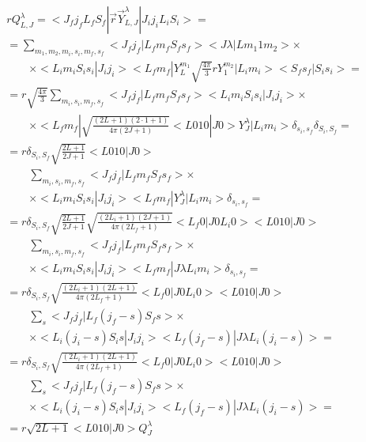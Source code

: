 \begin{align}
    \begin{split}
        &r Q_{L, J}^\lambda = <J_f j_f L_f S_f|\vec{r} \vec{Y}^{\lambda}_{L, J}|J_i j_i L_i S_i> = \\
        &= \sum_{m_1, m_2, m_i, s_i, m_f, s_f} <J_f j_f| L_f m_f S_f s_f> <J \lambda| L m_1 1 m_2> \times \\
        &\qquad\times <L_i m_i S_i s_i | J_i j_i> <L_f m_f| Y_L^{m_1} \sqrt{\frac{4 \pi}{3}} r Y_{1}^{m_2}|L_i m_i> <S_f s_f|S_i s_i> = \\
        &= r \sqrt{\frac{4 \pi}{3}} \sum_{m_i, s_i, m_f, s_f} <J_f j_f| L_f m_f S_f s_f> <L_i m_i S_i s_i | J_i j_i> \times \\
        &\qquad\times <L_f m_f| \sqrt{\frac{(2L+1)(2\cdot1+1)}{4 \pi (2J + 1)}} <L 0 1 0 | J 0> Y_J^\lambda|L_i m_i> \delta_{s_i, s_f} \delta_{S_i, S_f} = \\
        &= r \delta_{S_i, S_f} \sqrt{\frac{2L+1}{2J+1}} <L 0 1 0 | J 0> \\
        &\qquad\sum_{m_i, s_i, m_f, s_f} <J_f j_f| L_f m_f S_f s_f> \times \\
        &\qquad\times <L_i m_i S_i s_i | J_i j_i> <L_f m_f| Y_J^\lambda |L_i m_i> \delta_{s_i, s_f} = \\
        &= r \delta_{S_i, S_f} \sqrt{\frac{2L+1}{2J+1}} \sqrt{\frac{(2L_i+1)(2J+1)}{4 \pi (2L_f+1)}} <L_f 0 | J 0 L_i 0> <L 0 1 0 | J 0> \\
        &\qquad \sum_{m_i, s_i, m_f, s_f} <J_f j_f| L_f m_f S_f s_f> \times \\
        &\qquad\times <L_i m_i S_i s_i | J_i j_i> <L_f m_f| J \lambda L_i m_i> \delta_{s_i, s_f} = \\
        &= r \delta_{S_i, S_f} \sqrt{\frac{(2L_i+1)(2L+1)}{4 \pi (2L_f+1)}} <L_f 0 | J 0 L_i 0> <L 0 1 0 | J 0> \\
        &\qquad \sum_{s} <J_f j_f| L_f (j_f - s) S_f s> \times \\
        &\qquad\times <L_i (j_i - s) S_i s | J_i j_i> <L_f (j_f - s)| J \lambda L_i (j_i - s)> = \\
        &= r \delta_{S_i, S_f} \sqrt{\frac{(2L_i+1)(2L+1)}{4 \pi (2L_f+1)}} <L_f 0 | J 0 L_i 0> <L 0 1 0 | J 0> \\
        &\qquad \sum_{s} <J_f j_f| L_f (j_f - s) S_f s> \times \\
        &\qquad\times <L_i (j_i - s) S_i s | J_i j_i> <L_f (j_f - s)| J \lambda L_i (j_i - s)> = \\
        &=r \sqrt{2L+1} <L 0 1 0 | J 0> Q_{J}^{\lambda}
    \end{split}
\end{align}

